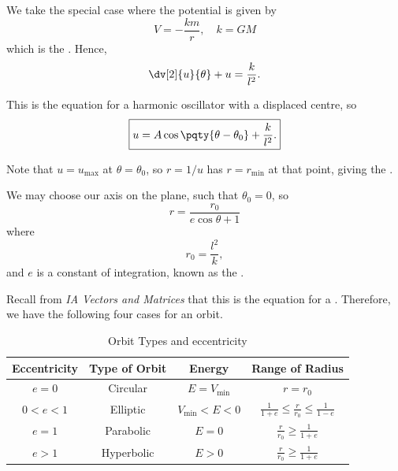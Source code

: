 We take the special case where the potential is given by
\begin{equation}
    V = - \frac{km}{r}, \quad k = GM
\end{equation}
which is the . Hence,
\begin{equation}
    \dv[2]{u}{\theta} + u = \frac{k}{l^2}.
\end{equation}

This is the equation for a harmonic oscillator with a displaced centre, so
\begin{equation}
    \boxed{u = A \cos \pqty{\theta - \theta_0} + \frac{k}{l^2}.}
\end{equation}

Note that \(u = u_{\max}\) at \(\theta = \theta_0\), so \(r = 1 / u\) has \(r = r_{\min}\) at that point, giving the .

We may choose our axis on the plane, such that \(\theta_0 = 0\), so
\begin{equation}
    \boxed{r = \frac{r_0}{e \cos \theta + 1}}
\end{equation}
where
\begin{equation}
    r_0 = \frac{l^2}{k},
\end{equation}
and \(e\) is a constant of integration, known as the .

Recall from \textit{IA Vectors and Matrices} that this is the equation for a . Therefore, we have the following four cases for an orbit.

\newcommand{\dsty}{\displaystyle}

\begin{table}[ht!]
    \centering
    \begin{tabular}{c|ccc}
        Eccentricity & Type of Orbit & Energy & Range of Radius \\
        \hline
        \(e = 0\) & Circular & \(E = V_{\min}\) & \(r = r_0\) \\
        \(0 < e < 1\) & Elliptic & \(V_{\min} < E < 0\) & \(\dsty \frac{1}{1 + e} \leq \frac{r}{r_0} \leq \frac{1}{1 - e}\) \\
        \(e = 1\) & Parabolic & \(E = 0\) & \(\dsty \frac{r}{r_0} \geq \frac{1}{1 + e}\) \\
        \(e > 1\) & Hyperbolic & \(E > 0\) & \(\dsty \frac{r}{r_0} \geq \frac{1}{1 + e}\)
    \end{tabular}
    \caption{Orbit Types and eccentricity}
    \label{tab:orbit-eccentricity}%
\end{table}

